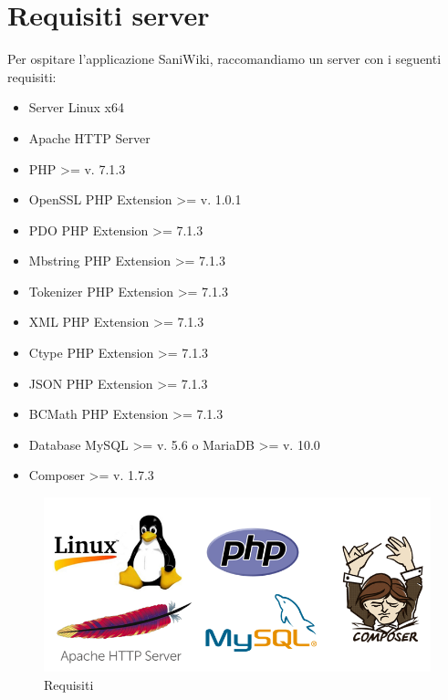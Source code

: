 \documentclass[twoside]{supsistudent}
\begin{document}
\section{Requisiti server}
Per ospitare l'applicazione SaniWiki, raccomandiamo un server con i seguenti requisiti:\\
\begin{itemize}
\item Server Linux x64\\
\item Apache HTTP Server\\
\item PHP >= v. 7.1.3\\
\item OpenSSL PHP Extension >= v. 1.0.1\\
\item PDO PHP Extension >= 7.1.3\\
\item Mbstring PHP Extension >= 7.1.3\\
\item Tokenizer PHP Extension >= 7.1.3\\
\item XML PHP Extension >= 7.1.3\\
\item Ctype PHP Extension >= 7.1.3\\
\item JSON PHP Extension >= 7.1.3\\
\item BCMath PHP Extension >= 7.1.3\\
\item Database MySQL >= v. 5.6 o MariaDB >= v. 10.0\\
\item Composer >= v. 1.7.3
\end{itemize}
\begin{figure}[!h]
\centering
\includegraphics[scale=0.7]{requirements.png}
\caption{Requisiti}
\end{figure}
\end{document}
